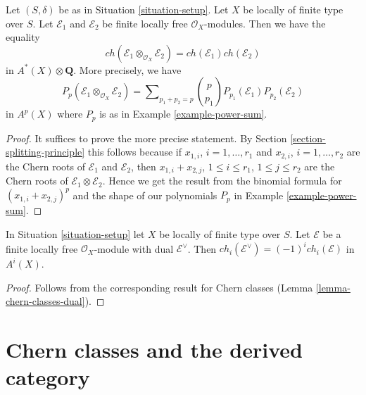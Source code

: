 \begin{lemma}
\label{lemma-chern-character-multiplicative}
Let $(S, \delta)$ be as in Situation \ref{situation-setup}. Let $X$ be locally
of finite type over $S$. Let $\mathcal{E}_1$ and $\mathcal{E}_2$
be finite locally free $\mathcal{O}_X$-modules.
Then we have the equality
$$
ch(\mathcal{E}_1 \otimes_{\mathcal{O}_X} \mathcal{E}_2) =
ch(\mathcal{E}_1) ch(\mathcal{E}_2)
$$
in $A^*(X) \otimes \mathbf{Q}$. More precisely, we have
$$
P_p(\mathcal{E}_1 \otimes_{\mathcal{O}_X} \mathcal{E}_2) =
\sum\nolimits_{p_1 + p_2 = p}
{p \choose p_1} P_{p_1}(\mathcal{E}_1) P_{p_2}(\mathcal{E}_2)
$$
in $A^p(X)$ where $P_p$ is as in Example \ref{example-power-sum}.
\end{lemma}

\begin{proof}
It suffices to prove the more precise statement. By
Section \ref{section-splitting-principle}
this follows because if $x_{1, i}$, $i = 1, \ldots, r_1$
and $x_{2, i}$, $i = 1, \ldots, r_2$ are the
Chern roots of $\mathcal{E}_1$ and $\mathcal{E}_2$, then
$x_{1, i} + x_{2, j}$, $1 \leq i \leq r_1$, $1 \leq j \leq r_2$
are the Chern roots of $\mathcal{E}_1 \otimes \mathcal{E}_2$.
Hence we get the result from the binomial formula for
$(x_{1, i} + x_{2, j})^p$ and the
shape of our polynomials $P_p$ in Example \ref{example-power-sum}.
\end{proof}

\begin{lemma}
\label{lemma-chern-character-dual}
In Situation \ref{situation-setup} let $X$ be locally of finite type over $S$.
Let $\mathcal{E}$ be a finite locally free $\mathcal{O}_X$-module
with dual $\mathcal{E}^\vee$. Then
$ch_i(\mathcal{E}^\vee) = (-1)^i ch_i(\mathcal{E})$ in $A^i(X)$.
\end{lemma}

\begin{proof}
Follows from the corresponding result for Chern classes
(Lemma \ref{lemma-chern-classes-dual}).
\end{proof}











\section{Chern classes and the derived category}
\label{section-pre-derived}

